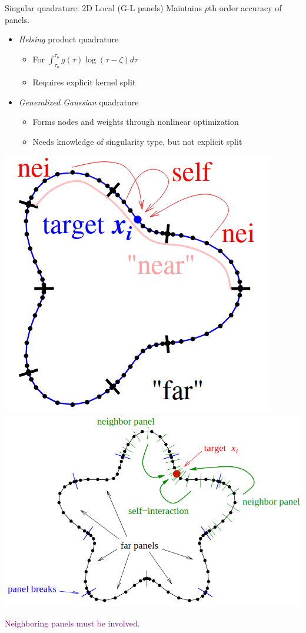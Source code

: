 \documentclass[t]{beamer}
\newcommand{\com}[1]{{\scriptsize \textcolor{purple}{#1}}}      %
\newcommand{\vg}{\vspace{2ex}}
\newcommand{\hg}{\vspace{0.5ex}}
\begin{document}
\begin{noframe}{Singular quadrature: 2D Local (G-L panels)}
Maintains $p$th order accuracy of panels.
\hg
\begin{itemize}
\item \emph{Helsing} product quadrature
  \begin{itemize}
  \item For
  $\int_{\tau_a}^{\tau_b} g(\tau)\log(\tau-\zeta)d\tau$
  \item Requires explicit kernel split
   \end{itemize}
 \item \emph{Generalized Gaussian} quadrature
   \begin{itemize}
   \item Forms nodes and weights through nonlinear optimization
   \item Needs knowledge of singularity type, but not explicit split
   \end{itemize}
\end{itemize}

\vg
\begin{center}
  \includegraphics[height=0.3\textwidth]{fig/panels_nearfar}
  \includegraphics[height=0.3\textwidth]{fig/gengauss_starfish}

  \com{Neighboring panels must be involved.}
\end{center}
\end{noframe}
\end{document}
